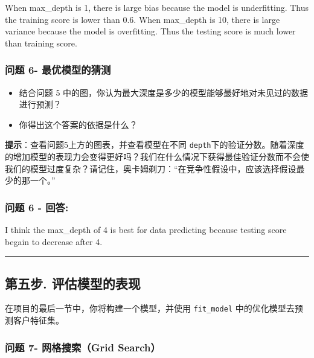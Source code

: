 \documentclass[11pt]{article}
\providecommand{\tightlist}{%
      \setlength{\itemsep}{0pt}\setlength{\parskip}{0pt}}
\begin{document}
When max\_depth is 1, there is large bias because the model is
underfitting. Thus the training score is lower than 0.6. When max\_depth
is 10, there is large variance because the model is overfitting. Thus
the testing score is much lower than training score.

    \subsubsection{问题 6-
最优模型的猜测}\label{ux95eeux9898-6--ux6700ux4f18ux6a21ux578bux7684ux731cux6d4b}

\begin{itemize}
\tightlist
\item
  结合问题 5
  中的图，你认为最大深度是多少的模型能够最好地对未见过的数据进行预测？
\item
  你得出这个答案的依据是什么？
\end{itemize}

\textbf{提示}：查看问题5上方的图表，并查看模型在不同
\texttt{depth}下的验证分数。随着深度的增加模型的表现力会变得更好吗？我们在什么情况下获得最佳验证分数而不会使我们的模型过度复杂？请记住，奥卡姆剃刀：``在竞争性假设中，应该选择假设最少的那一个。''

    \subsubsection{问题 6 - 回答:}\label{ux95eeux9898-6---ux56deux7b54}

I think the max\_depth of 4 is best for data predicting because testing
score begain to decrease after 4.

    \begin{center}\rule{0.5\linewidth}{\linethickness}\end{center}

\subsection{第五步.
评估模型的表现}\label{ux7b2cux4e94ux6b65.-ux8bc4ux4f30ux6a21ux578bux7684ux8868ux73b0}

在项目的最后一节中，你将构建一个模型，并使用 \texttt{fit\_model}
中的优化模型去预测客户特征集。

    \subsubsection{问题 7- 网格搜索（Grid
Search）}\label{ux95eeux9898-7--ux7f51ux683cux641cux7d22grid-search}
\end{document}
